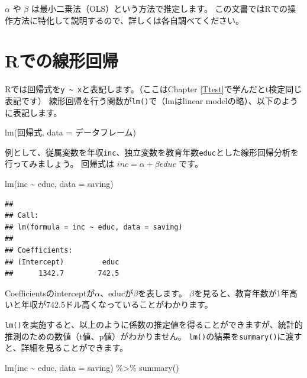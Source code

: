\documentclass[
]{book}
\newenvironment{Shaded}{\begin{snugshade}}{\end{snugshade}}
\newcommand{\AttributeTok}[1]{\textcolor[rgb]{0.77,0.63,0.00}{#1}}
\newcommand{\FunctionTok}[1]{\textcolor[rgb]{0.00,0.00,0.00}{#1}}
\newcommand{\NormalTok}[1]{#1}
\newcommand{\SpecialCharTok}[1]{\textcolor[rgb]{0.00,0.00,0.00}{#1}}
\begin{document}
\(\alpha\) や \(\beta\) は最小二乗法（OLS）という方法で推定します。
この文書ではRでの操作方法に特化して説明するので、詳しくは各自調べてください。

\hypertarget{rux3067ux306eux7ddaux5f62ux56deux5e30}{%
\section{Rでの線形回帰}\label{rux3067ux306eux7ddaux5f62ux56deux5e30}}

Rでは回帰式を\texttt{y\ \textasciitilde{}\ x}と表記します。（ここはChapter \ref{Ttest}で学んだとt検定同じ表記です）
線形回帰を行う関数が\texttt{lm()}で（lmはlinear modelの略）、以下のように表記します。

\begin{Shaded}
\begin{Highlighting}[]
\FunctionTok{lm}\NormalTok{(回帰式, }\AttributeTok{data =}\NormalTok{ データフレーム)}
\end{Highlighting}
\end{Shaded}

例として、従属変数を年収\texttt{inc}、独立変数を教育年数\texttt{educ}とした線形回帰分析を行ってみましょう。
回帰式は \(inc = \alpha + \beta educ\) です。

\begin{Shaded}
\begin{Highlighting}[]
\FunctionTok{lm}\NormalTok{(inc }\SpecialCharTok{\textasciitilde{}}\NormalTok{ educ, }\AttributeTok{data =}\NormalTok{ saving)}
\end{Highlighting}
\end{Shaded}

\begin{verbatim}
## 
## Call:
## lm(formula = inc ~ educ, data = saving)
## 
## Coefficients:
## (Intercept)         educ  
##      1342.7        742.5
\end{verbatim}

Coefficientsのinterceptが\(\alpha\)、educが\(\beta\)を表します。
\(\beta\)を見ると、教育年数が1年高いと年収が742.5ドル高くなっていることがわかります。

\texttt{lm()}を実施すると、以上のように係数の推定値を得ることができますが、統計的推測のための数値（t値、p値）がわかりません。
\texttt{lm()}の結果を\texttt{summary()}に渡すと、詳細を見ることができます。

\begin{Shaded}
\begin{Highlighting}[]
\FunctionTok{lm}\NormalTok{(inc }\SpecialCharTok{\textasciitilde{}}\NormalTok{ educ, }\AttributeTok{data =}\NormalTok{ saving) }\SpecialCharTok{\%\textgreater{}\%}
  \FunctionTok{summary}\NormalTok{()}
\end{Highlighting}
\end{Shaded}
\end{document}
